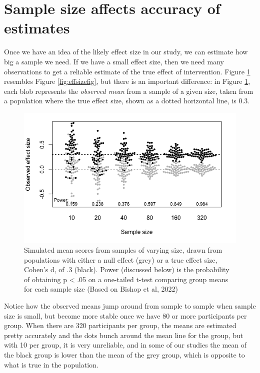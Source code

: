 \documentclass{krantz}
\begin{document}
\hypertarget{sample-size-affects-accuracy-of-estimates}{%
\section{Sample size affects accuracy of estimates}\label{sample-size-affects-accuracy-of-estimates}}

Once we have an idea of the likely effect size in our study, we can estimate how big a sample we need. If we have a small effect size, then we need many observations to get a reliable estimate of the true effect of intervention. Figure \ref{fig:varES} resembles Figure \ref{fig:effsizefig}, but there is an important difference: in Figure \ref{fig:varES}, each blob represents the \emph{observed mean} from a sample of a given size, taken from a population where the true effect size, shown as a dotted horizontal line, is 0.3.

\begin{figure}
\includegraphics[width=1\linewidth]{images_bw/beeswarms_ch10} \caption{Simulated mean scores from samples of varying size, drawn from populations with either a null effect (grey) or a true effect size, Cohen's d, of .3 (black). Power (discussed below) is the probability of obtaining p < .05 on a one-tailed t-test comparing group means for each sample size (Based on Bishop et al, 2022)}\label{fig:varES}
\end{figure}

Notice how the observed means jump around from sample to sample when sample size is small, but become more stable once we have 80 or more participants per group. When there are 320 participants per group, the means are estimated pretty accurately and the dots bunch around the mean line for the group, but with 10 per group, it is very unreliable, and in some of our studies the mean of the black group is lower than the mean of the grey group, which is opposite to what is true in the population.
\end{document}
